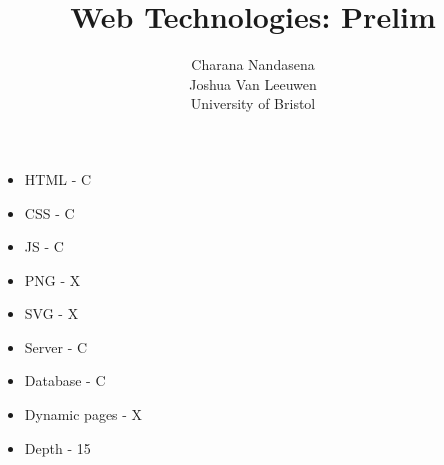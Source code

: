 \documentclass[11pt]{article}
\title{Web Technologies: Prelim}
\author{Charana Nandasena\\Joshua Van Leeuwen\\University of Bristol}
\date{}
\begin{document}
\maketitle

\begin{itemize}
\item{HTML - C}
\item{CSS - C}
\item{JS - C}
\item{PNG - X}
\item{SVG - X}
\item{Server - C}
\item{Database - C}
\item{Dynamic pages - X}
\item{Depth - 15}
\end{itemize}


\end{document}
